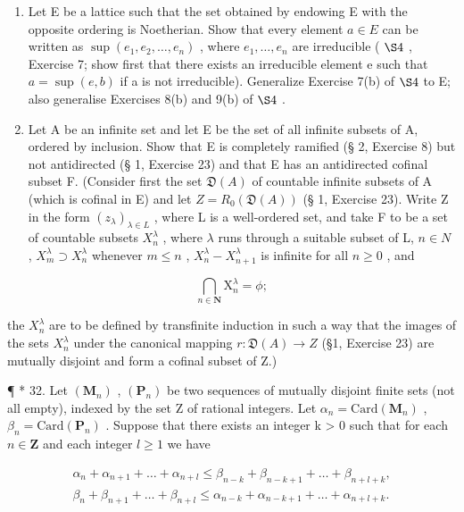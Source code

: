 \begin{enumerate}
\def\labelenumi{\arabic{enumi}.}
\setcounter{enumi}{29}
\item
  Let E be a lattice such that the set obtained by endowing E with the opposite ordering is Noetherian. Show that every element \(a \in E\) can be written as \(\sup (e_1, e_2, \ldots, e_n)\) , where \(e_1, \ldots, e_n\) are irreducible ( \(\S 4\) , Exercise 7; show first that there exists an irreducible element e such that \(a = \sup (e, b)\) if a is not irreducible). Generalize Exercise 7(b) of \(\S 4\) to E; also generalise Exercises 8(b) and 9(b) of \(\S 4\) .
\item
  Let A be an infinite set and let E be the set of all infinite subsets of A, ordered by inclusion. Show that E is completely ramified (§ 2, Exercise 8) but not antidirected (§ 1, Exercise 23) and that E has an antidirected cofinal subset F. (Consider first the set \(\mathfrak{D}(A)\) of countable infinite subsets of A (which is cofinal in E) and let \(Z = R_0(\mathfrak{D}(A))\) (§ 1, Exercise 23). Write Z in the form \((z_{\lambda})_{\lambda \in L}\) , where L is a well-ordered set, and take F to be a set of countable subsets \(X_n^{\lambda}\) , where \(\lambda\) runs through a suitable subset of L, \(n \in N\) , \(X_m^{\lambda} \supset X_n^{\lambda}\) whenever \(m \leqslant n\) , \(X_n^{\lambda} - X_{n+1}^{\lambda}\) is infinite for all \(n \geqslant 0\) , and
\end{enumerate}

\[
\bigcap_ {n \in \mathbf {N}} \mathrm{X} _ {n} ^ {\lambda} = \phi ;
\]

the \(X_{n}^{\lambda}\) are to be defined by transfinite induction in such a way that the images of the sets \(X_{n}^{\lambda}\) under the canonical mapping \(r: \mathfrak{D}(A) \to Z\) (§1, Exercise 23) are mutually disjoint and form a cofinal subset of Z.)

¶ * 32. Let \((\mathbf{M}_n)\) , \((\mathbf{P}_n)\) be two sequences of mutually disjoint finite sets (not all empty), indexed by the set Z of rational integers. Let \(\alpha_n = \text{Card}(\mathbf{M}_n)\) , \(\beta_n = \text{Card}(\mathbf{P}_n)\) . Suppose that there exists an integer k \textgreater{} 0 such that for each \(n \in \mathbf{Z}\) and each integer \(l \geqslant 1\) we have

\[
\begin{array}{l} \alpha_ {n} + \alpha_ {n + 1} + \dots + \alpha_ {n + l} \leqslant \beta_ {n - k} + \beta_ {n - k + 1} + \dots + \beta_ {n + l + k}, \\ \beta_ {n} + \beta_ {n + 1} + \dots + \beta_ {n + l} \leqslant \alpha_ {n - k} + \alpha_ {n - k + 1} + \dots + \alpha_ {n + l + k}. \end{array}
\]

